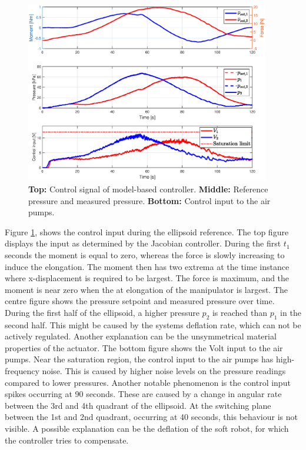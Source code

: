 \begin{figure}[H]
    \centering
    \includegraphics[width = 0.95\textwidth]{Figures/Chapter5/inputsellips.eps}
    \caption{\textbf{Top:} Control signal of model-based controller. \textbf{Middle:} Reference pressure and measured pressure. \textbf{Bottom:} Control input to the air pumps.}
    \label{fig5:controlellips}
\end{figure}


Figure \ref{fig5:controlellips}, shows the control input during the ellipsoid reference. The top figure displays the input as determined by the Jacobian controller. During the first $t_1$ seconds the moment is equal to zero, whereas the force is slowly increasing to induce the elongation. The moment then has two extrema at the time instance where x-displacement is required to be largest. The force is maximum, and the moment is near zero when the at elongation of the manipulator is largest. The centre figure shows the pressure setpoint and measured pressure over time. During the first half of the ellipsoid, a higher pressure $p_2$ is reached than $p_1$ in the second half. This might be caused by the systems deflation rate, which can not be actively regulated. Another explanation can be the unsymmetrical material properties of the actuator. The bottom figure shows the Volt input to the air pumps. Near the saturation region, the control input to the air pumps has high-frequency noise. This is caused by higher noise levels on the pressure readings compared to lower pressures. Another notable phenomenon is the control input spikes occurring at 90 seconds. These are caused by a change in angular rate between the 3rd and 4th quadrant of the ellipsoid. At the switching plane between the 1st and 2nd quadrant, occurring at 40 seconds, this behaviour is not visible. A possible explanation can be the deflation of the soft robot, for which the controller tries to compensate. 






